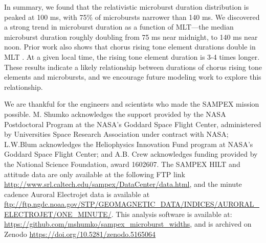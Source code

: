 \documentclass[draft]{agujournal2019}
\begin{document}
In summary, we found that the relativistic microburst duration distribution is peaked at 100 ms, with 75\% of microbursts narrower than 140 ms. We discovered a strong trend in microburst duration as a function of MLT---the median microburst duration roughly doubling from 75 ms near midnight, to 140 ms near noon. Prior work also shows that chorus rising tone element durations double in MLT \cite{Shue2019,Teng2017}. At a given local time, the rising tone element duration is 3-4 times longer. These results indicate a likely relationship between durations of chorus rising tone elements and microbursts, and we encourage future modeling work to explore this relationship.


%
%
%
%

\acknowledgments
We are thankful for the engineers and scientists who made the SAMPEX mission possible. M. Shumko acknowledges the support provided by the NASA Postdoctoral Program at the NASA’s Goddard Space Flight Center, administered by Universities Space Research Association under contract with NASA; L.W.Blum acknowledges the Heliophysics Innovation Fund program at NASA’s Goddard Space Flight Center; and A.B. Crew acknowledges funding provided by the National Science Foundation, award 1602607. The SAMPEX HILT and attitude data are only available at the following FTP link \url{http://www.srl.caltech.edu/sampex/DataCenter/data.html}, and the minute cadence Auroral Electrojet data is available at \url{ftp://ftp.ngdc.noaa.gov/STP/GEOMAGNETIC_DATA/INDICES/AURORAL_ELECTROJET/ONE_MINUTE/}.
This analysis software is available at: \url{https://github.com/mshumko/sampex_microburst_widths}, and is archived on Zenodo \url{https://doi.org/10.5281/zenodo.5165064}



%
%
\end{document}
